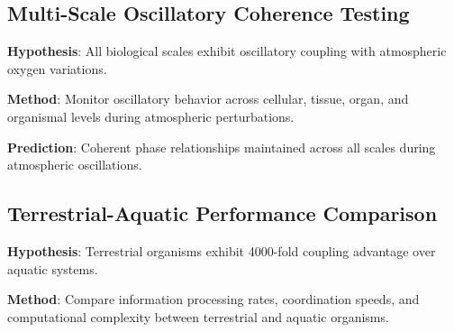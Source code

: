 \documentclass[twocolumn]{article}
\begin{document}
\subsection{Multi-Scale Oscillatory Coherence Testing}

\textbf{Hypothesis}: All biological scales exhibit oscillatory coupling with atmospheric oxygen variations.

\textbf{Method}: Monitor oscillatory behavior across cellular, tissue, organ, and organismal levels during atmospheric perturbations.

\textbf{Prediction}: Coherent phase relationships maintained across all scales during atmospheric oscillations.

\subsection{Terrestrial-Aquatic Performance Comparison}

\textbf{Hypothesis}: Terrestrial organisms exhibit 4000-fold coupling advantage over aquatic systems.

\textbf{Method}: Compare information processing rates, coordination speeds, and computational complexity between terrestrial and aquatic organisms.
\end{document}
